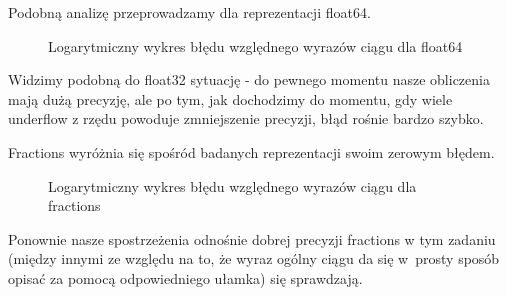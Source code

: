 Podobną analizę przeprowadzamy dla reprezentacji float64.
\begin{figure}[h!]
	\caption{Logarytmiczny wykres błędu względnego wyrazów ciągu dla float64}
	\label{zad2:graph8}
\end{figure}

Widzimy podobną do float32 sytuację - do pewnego momentu nasze obliczenia mają dużą precyzję, ale po tym, jak dochodzimy do momentu, gdy wiele underflow z rzędu powoduje zmniejszenie precyzji, błąd rośnie bardzo szybko.

Fractions wyróżnia się spośród badanych reprezentacji swoim zerowym błędem.
\begin{figure}[h!]
	\caption{Logarytmiczny wykres błędu względnego wyrazów ciągu dla fractions}
	\label{zad2:graph9}
\end{figure}

Ponownie nasze spostrzeżenia odnośnie dobrej precyzji fractions w tym zadaniu (między innymi ze względu na to, że wyraz ogólny ciągu da się w~prosty sposób opisać za pomocą odpowiedniego ułamka) się sprawdzają. 

